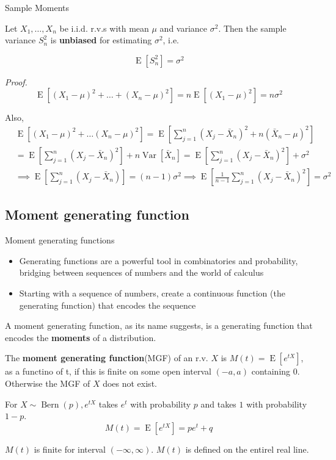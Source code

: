 \documentclass[8pt]{beamer}
\newcommand{\tb}[1]{\textbf{#1}}
\newcommand{\ti}[1]{\textit{#1}}
\newcommand{\myber}[1]{\operatorname{Bern}\!\left(#1\right)}
\newcommand{\expec}[1]{\operatorname{E}\left[ #1 \right]}
\newcommand{\myvar}[1]{\operatorname{Var}\left[#1\right]}
\begin{document}
\begin{frame}{Sample Moments}
    \begin{theorem}
        Let $X_1, \dots, X_n$ be i.i.d. r.v.s with mean $\mu$ and variance $\sigma^2$. Then the sample variance $S^2_n$ is \tb{unbiased} for estimating $\sigma^2$, i.e.
            
        \[ \expec{S^2_n} = \sigma^2 \]
    \end{theorem}

    \ti{Proof.}
    \[
        \expec{(X_1 - \mu)^2 + \dots + (X_n - \mu)^2} = n \expec{(X_1 - \mu)^2} = n \sigma^2
    \]

    Also, 
    \[
    \begin{aligned}
        &\expec{(X_1 - \mu)^2 + \dots (X_n - \mu)^2} = \expec{\sum_{j=1}^n(X_j - \bar{X}_n)^2 + n (\bar{X}_n - \mu)^2 } \\ 
        &= \expec{\sum_{j=1}^n (X_j - \bar{X}_n)^2} + n \myvar{\bar{X}_n} = \expec{\sum_{j=1}^n (X_j - \bar{X}_n)^2} + \sigma^2 \\
        &\implies \expec{\sum_{j=1}^n (X_j - \bar{X}_n)} = (n-1) \sigma^2 \implies \expec{\frac{1}{n-1} \sum_{j=1}^n (X_j - \bar{X}_n)^2} = \sigma^2
    \end{aligned}
    \]
\end{frame}

\subsection{Moment generating function}

\begin{frame}{Moment generating functions}
    \begin{itemize}
        \item Generating functions are a powerful tool in combinatories and probability, bridging between sequences of numbers and the world of calculus
        \item Starting with a sequence of numbers, create a continuous function (the generating function) that encodes the sequence
    \end{itemize}

    A moment generating function, as its name suggests, is a generating function that encodes the \tb{moments} of a distribution.

    \begin{definition}
        The \tb{moment generating function}(MGF) of an r.v. $X$ is $M(t) = \expec{e^{tX}}$, as a functino of t, if this is finite on some open interval $(-a, a)$ containing $0$. Otherwise the MGF of $X$ does not exist.
    \end{definition}

    \begin{example}
        For $X \sim \myber{p}, e^{tX}$ takes $e^t$ with probability $p$ and takes $1$ with probability $1-p$.
        \[
        M(t) = \expec{e^{tX}} = pe^t + q
        \]

        $M(t)$ is finite for interval $(-\infty, \infty)$. $M(t)$ is defined on the entirel real line.
    \end{example}
\end{frame}
\end{document}
